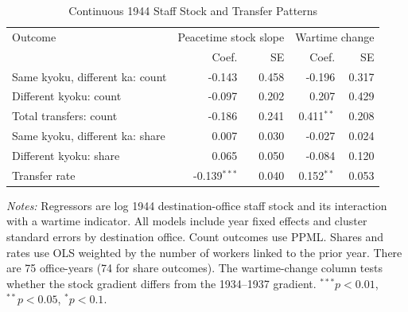 \begin{table}[htbp]
\centering
\caption{Continuous 1944 Staff Stock and Transfer Patterns}
\label{tab:continuous-stock}
\small
\begin{threeparttable}
\begin{tabular}{lrrrr}
\toprule
Outcome & \multicolumn{2}{c}{Peacetime stock slope} & \multicolumn{2}{c}{Wartime change} \\
& Coef. & SE & Coef. & SE \\
\midrule
Same kyoku, different ka: count & -0.143 & 0.458 & -0.196 & 0.317 \\
Different kyoku: count & -0.097 & 0.202 & 0.207 & 0.429 \\
Total transfers: count & -0.186 & 0.241 & 0.411$^{**}$ & 0.208 \\
Same kyoku, different ka: share & 0.007 & 0.030 & -0.027 & 0.024 \\
Different kyoku: share & 0.065 & 0.050 & -0.084 & 0.120 \\
Transfer rate & -0.139$^{***}$ & 0.040 & 0.152$^{**}$ & 0.053 \\
\bottomrule
\end{tabular}
\begin{tablenotes}[flushleft]\footnotesize
\item \textit{Notes:} Regressors are log 1944 destination-office staff stock and its interaction with a wartime indicator. All models include year fixed effects and cluster standard errors by destination office. Count outcomes use PPML. Shares and rates use OLS weighted by the number of workers linked to the prior year. There are 75 office-years (74 for share outcomes). The wartime-change column tests whether the stock gradient differs from the 1934--1937 gradient. $^{***}p<0.01$, $^{**}p<0.05$, $^{*}p<0.1$.
\end{tablenotes}
\end{threeparttable}
\end{table}
